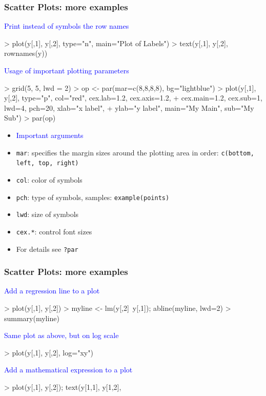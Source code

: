 \documentclass{beamer}
\newcommand{\Rfunction}[1]{{\texttt{#1}}}
\newcommand{\Rfunarg}[1]{{\texttt{#1}}}
\begin{document}
\begin{frame}[containsverbatim]  
	\frametitle{Scatter Plots: more examples}
\scriptsize
\textcolor{blue}{Print instead of symbols the row names}
\begin{Schunk}
\begin{Sinput}
> plot(y[,1], y[,2], type="n", main="Plot of Labels")
> text(y[,1], y[,2], rownames(y)) 
\end{Sinput}
\end{Schunk}
\textcolor{blue}{Usage of important plotting parameters}
\begin{Schunk}
\begin{Sinput}
> grid(5, 5, lwd = 2) 
> op <- par(mar=c(8,8,8,8), bg="lightblue")
> plot(y[,1], y[,2], type="p", col="red", cex.lab=1.2, cex.axis=1.2, 
+      cex.main=1.2, cex.sub=1, lwd=4, pch=20, xlab="x label", 
+      ylab="y label", main="My Main", sub="My Sub")
> par(op)
\end{Sinput}
\end{Schunk}
\begin{itemize}
\scriptsize
        \item[] \hspace{-0.8cm}\textcolor{blue}{Important arguments}
        \item \Rfunarg{mar}: specifies the margin sizes around the plotting area in order: \Rfunction{c(bottom, left, top, right)} 
        \item \Rfunarg{col}: color of symbols
        \item \Rfunarg{pch}: type of symbols, samples: \Rfunction{example(points)}
        \item \Rfunarg{lwd}: size of symbols
        \item \Rfunarg{cex.*}: control font sizes
        \item For details see \Rfunction{?par}
\end{itemize}
\end{frame}
\begin{frame}[containsverbatim]  
	\frametitle{Scatter Plots: more examples}
\scriptsize
\textcolor{blue}{Add a regression line to a plot}
\begin{Schunk}
\begin{Sinput}
> plot(y[,1], y[,2])
> myline <- lm(y[,2]~y[,1]); abline(myline, lwd=2) 
> summary(myline) 
\end{Sinput}
\end{Schunk}
\textcolor{blue}{Same plot as above, but on log scale}
\begin{Schunk}
\begin{Sinput}
> plot(y[,1], y[,2], log="xy") 
\end{Sinput}
\end{Schunk}
\textcolor{blue}{Add a mathematical expression to a plot}
\begin{Schunk}
\begin{Sinput}
> plot(y[,1], y[,2]); text(y[1,1], y[1,2], 
\end{Sinput}
\end{Schunk}
\end{frame}
\end{document}
